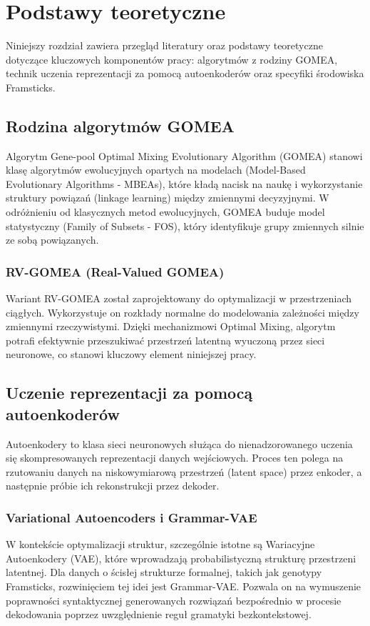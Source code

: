 
\chapter{Podstawy teoretyczne}

Niniejszy rozdział zawiera przegląd literatury oraz podstawy teoretyczne dotyczące kluczowych komponentów pracy: algorytmów z rodziny GOMEA, technik uczenia reprezentacji za pomocą autoenkoderów oraz specyfiki środowiska Framsticks.

\section{Rodzina algorytmów GOMEA}
Algorytm Gene-pool Optimal Mixing Evolutionary Algorithm (GOMEA) stanowi klasę algorytmów ewolucyjnych opartych na modelach (Model-Based Evolutionary Algorithms - MBEAs), które kładą nacisk na naukę i wykorzystanie struktury powiązań (linkage learning) między zmiennymi decyzyjnymi. W odróżnieniu od klasycznych metod ewolucyjnych, GOMEA buduje model statystyczny (Family of Subsets - FOS), który identyfikuje grupy zmiennych silnie ze sobą powiązanych.

\subsection{RV-GOMEA (Real-Valued GOMEA)}
Wariant RV-GOMEA został zaprojektowany do optymalizacji w przestrzeniach ciągłych. Wykorzystuje on rozkłady normalne do modelowania zależności między zmiennymi rzeczywistymi. Dzięki mechanizmowi Optimal Mixing, algorytm potrafi efektywnie przeszukiwać przestrzeń latentną wyuczoną przez sieci neuronowe, co stanowi kluczowy element niniejszej pracy.

\section{Uczenie reprezentacji za pomocą autoenkoderów}
Autoenkodery to klasa sieci neuronowych służąca do nienadzorowanego uczenia się skompresowanych reprezentacji danych wejściowych. Proces ten polega na rzutowaniu danych na niskowymiarową przestrzeń (latent space) przez enkoder, a następnie próbie ich rekonstrukcji przez dekoder.

\subsection{Variational Autoencoders i Grammar-VAE}
W kontekście optymalizacji struktur, szczególnie istotne są Wariacyjne Autoenkodery (VAE), które wprowadzają probabilistyczną strukturę przestrzeni latentnej. Dla danych o ścisłej strukturze formalnej, takich jak genotypy Framsticks, rozwinięciem tej idei jest Grammar-VAE. Pozwala on na wymuszenie poprawności syntaktycznej generowanych rozwiązań bezpośrednio w procesie dekodowania poprzez uwzględnienie reguł gramatyki bezkontekstowej.

